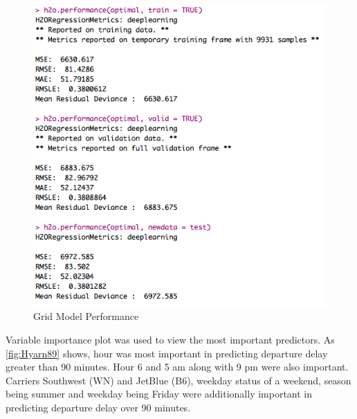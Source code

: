 \documentclass[12pt,twoside]{amherstthesis}
\begin{document}
  \begin{figure}[htbp]
  \centering
  \includegraphics[scale = 0.8,angle = 0]{figure/DeepVarMod1.png}
  \caption[Grid Model Performance]{\normalsize{Grid Model Performance}}
  \label{fig:Hyarn122}
  \end{figure}
  
  Variable importance plot was used to view the most important predictors.
  As \autoref{fig:Hyarn89} shows, hour was most important in predicting
  departure delay greater than 90 minutes. Hour 6 and 5 am along with 9 pm
  were also important. Carriers Southwest (WN) and JetBlue (B6), weekday
  status of a weekend, season being summer and weekday being Friday were
  additionally important in predicting departure delay over 90 minutes.
  
  \begin{Shaded}
  \begin{Highlighting}[]
   \NormalTok{)}
  \end{Highlighting}
  \end{Shaded}
  
\end{document}
